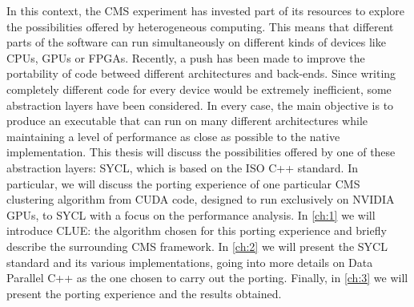 \documentclass[12pt,a4paper]{report}
\begin{document}
In this context, the CMS experiment has invested part of its resources to explore the possibilities offered by heterogeneous computing. This means that different parts of the software can run simultaneously on different kinds of devices like CPUs, GPUs or FPGAs. Recently, a push has been made to improve the portability of code betweed different architectures and back-ends. Since writing completely different code for every device would be extremely inefficient, some abstraction layers have been considered. In every case, the main objective is to produce an executable that can run on many different architectures while maintaining a level of performance as close as possible to the native implementation. \newline
This thesis will discuss the possibilities offered by one of these abstraction layers: SYCL, which is based on the ISO C++ standard. In particular, we will discuss the porting experience of one particular CMS clustering algorithm from CUDA code, designed to run exclusively on NVIDIA GPUs, to SYCL with a focus on the performance analysis. \newline
In \autoref{ch:1} we will introduce CLUE: the algorithm chosen for this porting experience and briefly describe the surrounding CMS framework.
In \autoref{ch:2} we will present the SYCL standard and its various implementations, going into more details on Data Parallel C++ as the one chosen to carry out the porting. Finally, in \autoref{ch:3} we will present the porting experience and the results obtained.












\end{document}
